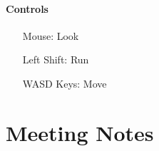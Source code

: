
\subsubsection{Controls}
\begin{center}
    \begin{minipage}{0.5\textwidth}
        \begin{itemize}
            \item[Mouse:] Look
            \item[Left Shift:] Run
            \item[WASD Keys:] Move
        \end{itemize}
    \end{minipage}
\end{center}


\chapter{Meeting Notes}\label{sec:meeting_notes}
